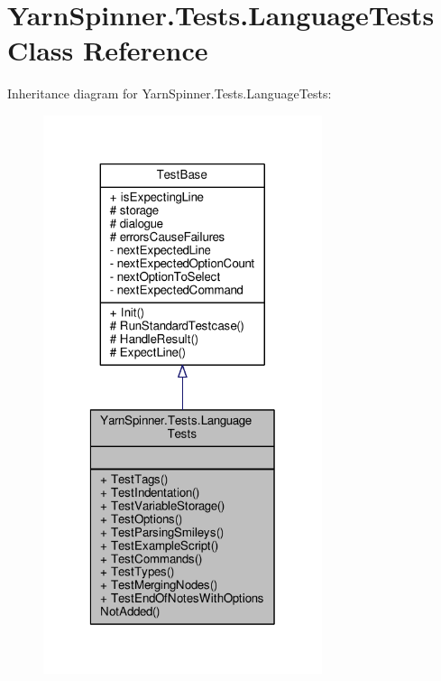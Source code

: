 \hypertarget{a00098}{\section{Yarn\-Spinner.\-Tests.\-Language\-Tests Class Reference}
\label{a00098}
}


Inheritance diagram for Yarn\-Spinner.\-Tests.\-Language\-Tests\-:
\nopagebreak
\begin{figure}[H]
\begin{center}
\leavevmode
\includegraphics[width=232pt]{d2/db1/a00730}
\end{center}
\end{figure}


